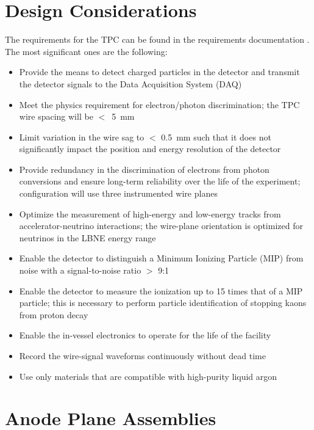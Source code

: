 \section{Design Considerations} 
\label{sec:v5-tpc-reqs-n-specs}

The requirements for the TPC can be found in the requirements documentation \cite{lar-fd-req}. The most significant ones are the following:

\begin{itemize}	
\item Provide the means to detect charged particles in the detector and transmit the detector signals to the Data Acquisition System (DAQ)
\item Meet the physics requirement for electron/photon discrimination;  the TPC wire spacing will be $<$~5~mm
\item Limit variation in the wire sag to $<$ 0.5~mm such that it does not significantly impact the position and energy resolution of the detector
\item Provide redundancy in the discrimination of electrons from photon conversions and ensure long-term reliability over the life of the experiment;  configuration will use three instrumented wire planes
\item Optimize the measurement of high-energy and low-energy tracks from accelerator-neutrino interactions; the wire-plane orientation is optimized for neutrinos in the LBNE energy range
\item Enable the detector to distinguish a Minimum Ionizing Particle (MIP) from noise with a signal-to-noise ratio $>$ 9:1
\item Enable the detector to measure the ionization up to 15 times that of a MIP particle; this is necessary to perform particle identification of stopping kaons from proton decay
\item Enable the in-vessel electronics to operate for the life of the facility
\item Record the wire-signal waveforms continuously without dead time
\item Use only materials that are compatible with high-purity liquid argon

\end{itemize}

\section{Anode Plane Assemblies}
\label{subsec:v5-tpc-chamber-apa}


